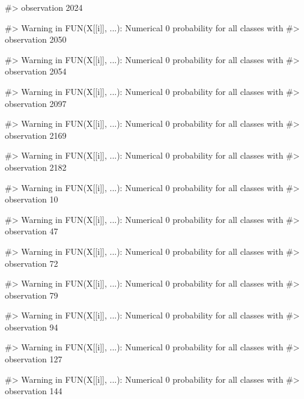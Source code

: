 \begin{Schunk}
\begin{Soutput}
#> observation 2024
\end{Soutput}
\begin{Soutput}
#> Warning in FUN(X[[i]], ...): Numerical 0 probability for all classes with
#> observation 2050
\end{Soutput}
\begin{Soutput}
#> Warning in FUN(X[[i]], ...): Numerical 0 probability for all classes with
#> observation 2054
\end{Soutput}
\begin{Soutput}
#> Warning in FUN(X[[i]], ...): Numerical 0 probability for all classes with
#> observation 2097
\end{Soutput}
\begin{Soutput}
#> Warning in FUN(X[[i]], ...): Numerical 0 probability for all classes with
#> observation 2169
\end{Soutput}
\begin{Soutput}
#> Warning in FUN(X[[i]], ...): Numerical 0 probability for all classes with
#> observation 2182
\end{Soutput}
\begin{Soutput}
#> Warning in FUN(X[[i]], ...): Numerical 0 probability for all classes with
#> observation 10
\end{Soutput}
\begin{Soutput}
#> Warning in FUN(X[[i]], ...): Numerical 0 probability for all classes with
#> observation 47
\end{Soutput}
\begin{Soutput}
#> Warning in FUN(X[[i]], ...): Numerical 0 probability for all classes with
#> observation 72
\end{Soutput}
\begin{Soutput}
#> Warning in FUN(X[[i]], ...): Numerical 0 probability for all classes with
#> observation 79
\end{Soutput}
\begin{Soutput}
#> Warning in FUN(X[[i]], ...): Numerical 0 probability for all classes with
#> observation 94
\end{Soutput}
\begin{Soutput}
#> Warning in FUN(X[[i]], ...): Numerical 0 probability for all classes with
#> observation 127
\end{Soutput}
\begin{Soutput}
#> Warning in FUN(X[[i]], ...): Numerical 0 probability for all classes with
#> observation 144
\end{Soutput}
\begin{Soutput}

\end{Soutput}
\end{Schunk}
